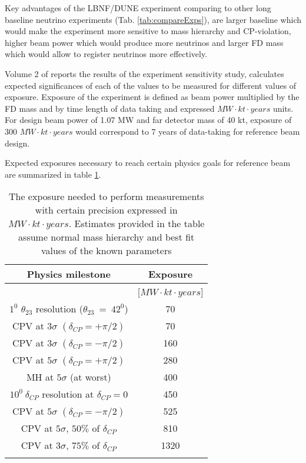Key advantages of the LBNF/DUNE experiment comparing to other long baseline neutrino experiments (Tab. \ref{tab:compareExps}), are larger baseline which would make the experiment more sensitive to mass hierarchy and CP-violation, higher beam power which would produce more neutrinos and larger FD mass which would allow to register neutrinos more effectively. 

Volume 2 of \cite{ref_LBNF_CDR} reports the results of the experiment sensitivity study, calculates expected significances of each of the values to be measured for different values of exposure. Exposure of the experiment is defined as beam power multiplied by the FD mass and by time length of data taking and expressed   $MW \cdot kt \cdot years$ units. For design beam power of 1.07 MW and far detector mass of 40 kt, exposure of 300 $MW \cdot kt \cdot years$ would correspond to 7 years of data-taking for reference beam design.

Expected exposures necessary to reach certain physics goals for reference beam are summarized in table \ref{tab:exposures_needed}.


\begin{table}[h]
  \centering
  \begin{center}
  \caption{ The exposure needed to perform measurements with certain precision expressed in $MW \cdot kt \cdot years$. Estimates provided in the table assume normal mass hierarchy and best fit values of the known parameters }
  \begin{tabular}{|c|c|}
  \hline  
  Physics milestone & Exposure  \\ \hline
   & [$MW \cdot kt \cdot years$]  \\ \hline
  $1^0$ $\theta_{23}$ resolution ($\theta_{23}~=~42^0$) & 70 \\ \hline
  CPV at $3\sigma$ $(\delta_{CP}=+\pi/2)$ & 70  \\ \hline
  CPV at $3\sigma$ $(\delta_{CP}=-\pi/2)$ & 160  \\ \hline
  CPV at $5\sigma$ $(\delta_{CP}=+\pi/2)$ & 280  \\ \hline
  MH at $5\sigma$ (at worst) & 400  \\ \hline
  $10^0~\delta_{CP}$ resolution at $\delta_{CP}=0$ & 450  \\ \hline
  CPV at $5\sigma$ $(\delta_{CP}=-\pi/2)$ & 525  \\ \hline
  CPV at $5\sigma$, $50\%$ of $\delta_{CP}$ & 810  \\ \hline
  CPV at $3\sigma$, $75\%$ of $\delta_{CP}$ & 1320  \\ \hline
  \label{tab:exposures_needed}
  \end{tabular}
  \end{center}
\end{table}

